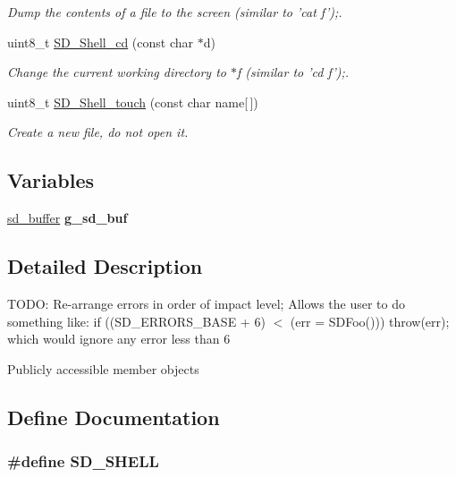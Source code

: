 \begin{DoxyCompactItemize}
\begin{DoxyCompactList}\small\item\em \-Dump the contents of a file to the screen (similar to 'cat f');. \end{DoxyCompactList}\item 
uint8\-\_\-t \hyperlink{group__SD__Public_gadf4f410c8c353e6a84f77e1df1b9e424}{\-S\-D\-\_\-\-Shell\-\_\-cd} (const char $\ast$d)
\begin{DoxyCompactList}\small\item\em \-Change the current working directory to $\ast$f (similar to 'cd f');. \end{DoxyCompactList}\item 
uint8\-\_\-t \hyperlink{group__SD__Public_gad2b78b0a9efcd14f43c2ab9e38d80e7f}{\-S\-D\-\_\-\-Shell\-\_\-touch} (const char name\mbox{[}$\,$\mbox{]})
\begin{DoxyCompactList}\small\item\em \-Create a new file, do not open it. \end{DoxyCompactList}\end{DoxyCompactItemize}
\subsection*{\-Variables}
\begin{DoxyCompactItemize}
\item 
\hypertarget{group__SD__Public_ga0bd95548a4187da52f3cda8634fefded}{\hyperlink{struct__sd__buffer}{sd\-\_\-buffer} {\bfseries g\-\_\-sd\-\_\-buf}}\label{group__SD__Public_ga0bd95548a4187da52f3cda8634fefded}

\end{DoxyCompactItemize}


\subsection{\-Detailed \-Description}
\-T\-O\-D\-O\-: \-Re-\/arrange errors in order of impact level; \-Allows the user to do something like\-: if ((\-S\-D\-\_\-\-E\-R\-R\-O\-R\-S\-\_\-\-B\-A\-S\-E + 6) $<$ (err = \-S\-D\-Foo())) throw(err); which would ignore any error less than 6

\-Publicly accessible member objects 

\subsection{\-Define \-Documentation}
\hypertarget{group__SD__Public_ga453e7feb2ddf9256c6b5ab9399b12abc}{
\subsubsection[{\-S\-D\-\_\-\-S\-H\-E\-L\-L}]{\setlength{\rightskip}{0pt plus 5cm}\#define {\bf \-S\-D\-\_\-\-S\-H\-E\-L\-L}}}\label{group__SD__Public_ga453e7feb2ddf9256c6b5ab9399b12abc}


